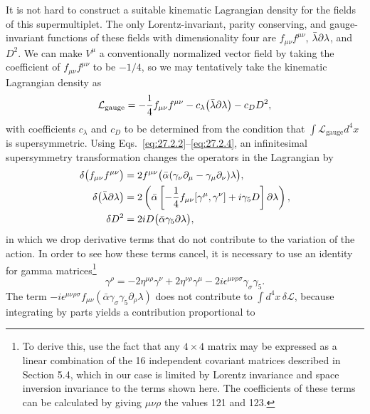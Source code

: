 It is not hard to construct a suitable kinematic Lagrangian density for
the fields of this supermultiplet. The only Lorentz-invariant, parity
conserving, and gauge-invariant functions of these fields with
dimensionality four are \(f_{\mu\nu}f^{\mu\nu}\),
\(\bar\lambda\sl{\partial}\lambda\), and \(D^2\). We can make \(V^\mu\) a
conventionally normalized vector field by taking the coefficient of
\(f_{\mu\nu}f^{\mu\nu}\) to be \(-1/4\), so we may tentatively take the
kinematic Lagrangian density as
\[
  \mathcal{L}_{\mathrm{gauge}}
  =-\frac14 f_{\mu\nu}f^{\mu\nu}
  -c_\lambda\bigl(\bar\lambda\sl{\partial}\lambda\bigr)
  -c_DD^2,
\]
with coefficients \(c_\lambda\) and \(c_D\) to be determined from the
condition that \(\int\mathcal{L}_{\mathrm{gauge}}d^4x\) is supersymmetric.
Using Eqs.~\eqref{eq:27.2.2}--\eqref{eq:27.2.4}, an infinitesimal
supersymmetry transformation changes the operators in the Lagrangian by
\[
  \begin{aligned}
  \delta\bigl(f_{\mu\nu}f^{\mu\nu}\bigr)
  &=2f^{\mu\nu}
    \bigl(\bar\alpha(\gamma_\nu\partial_\mu
      -\gamma_\mu\partial_\nu)\lambda\bigr),
  \\
  \delta\bigl(\bar\lambda\sl{\partial}\lambda\bigr)
  &=2\left(
    \bar\alpha\left[-\frac14f_{\mu\nu}[\gamma^\mu,\gamma^\nu]
      +i\gamma_5D\right]\sl{\partial}\lambda
  \right),
  \\
  \delta D^2&=2iD\bigl(\bar\alpha\gamma_5\sl{\partial}\lambda\bigr),
  \end{aligned}
\]
in which we drop derivative terms that do not contribute to the variation
of the action. In order to see how these terms cancel, it is necessary to
use an identity for gamma matrices\footnote{To derive this, use the fact
that any \(4\times4\) matrix may be expressed as a linear combination of
the 16 independent covariant matrices described in Section 5.4, which in
our case is limited by Lorentz invariance and space inversion invariance
to the terms shown here. The coefficients of these terms can be calculated
by giving \(\mu\nu\rho\) the values 121 and 123.}
\begin{equation}
  [\gamma^\mu,\gamma^\nu]\gamma^\rho
  =-2\eta^{\mu\rho}\gamma^\nu
  +2\eta^{\nu\rho}\gamma^\mu
  -2i\epsilon^{\mu\nu\rho\sigma}\gamma_\sigma\gamma_5.
  \tag{27.2.5}\label{eq:27.2.5}
\end{equation}
The term
\(-i\epsilon^{\mu\nu\rho\sigma}f_{\mu\nu}
(\bar\alpha\gamma_\sigma\gamma_5\partial_\rho\lambda)\)
does not contribute to \(\int d^4x\,\delta\mathcal{L}\), because
integrating by parts yields a contribution proportional to
